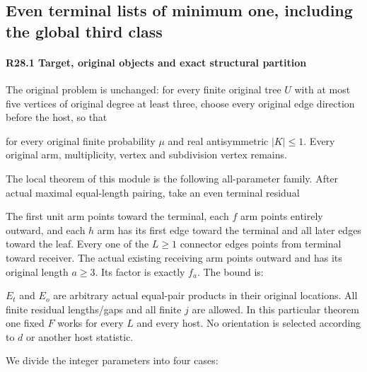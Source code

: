 \subsection{Even terminal lists of minimum one, including the global third class}\label{proof:R2-C028}

\paragraph{R28.1 Target, original objects and exact structural partition}

The original problem is unchanged: for every finite original tree \(U\) with at most five vertices of original degree at least three, choose every original edge direction before the host, so that


for every original finite probability \(\mu\) and real antisymmetric \(\lvert K\rvert \le 1\). Every original arm, multiplicity, vertex and subdivision vertex remains.

The local theorem of this module is the following all-parameter family. After actual maximal equal-length pairing, take an even terminal residual


The first unit arm points toward the terminal, each \(f\) arm points entirely outward, and each \(h\) arm has its first edge toward the terminal and all later edges toward the leaf. Every one of the \(L\ge 1\) connector edges points from terminal toward receiver. The actual existing receiving arm points outward and has its original length \(a\ge 3\). Its factor is exactly \(f_a\). The bound is:


\(E_t\) and \(E_o\) are arbitrary actual equal-pair products in their original locations. All finite residual lengths/gaps and all finite \(j\) are allowed. In this particular theorem one fixed \(F\) works for every \(L\) and every host. No orientation is selected according to \(d\) or another host statistic.

We divide the integer parameters into four cases:

